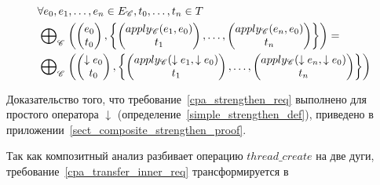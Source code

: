 \begin{itemize}
\begin{equation}
\label{cpa_strengthen_req}
\begin{aligned}
& \forall e_0, e_1, \dots, e_n \in E_{\mathscr{C}}, t_0, \dots, t_n \in T \\
& \mathrel{\bigoplus}_{\mathscr{C}}
\left(
\begin{pmatrix}
e_0 \\
t_0 
\end{pmatrix},
\left\{
\begin{pmatrix}
apply_{\mathscr{C}}(e_1, e_0) \\
t_1 
\end{pmatrix},
\dots ,
\begin{pmatrix}
apply_{\mathscr{C}}(e_n, e_0) \\
t_n 
\end{pmatrix}
\right\}
\right) = \\
& \mathrel{\bigoplus}_{\mathscr{C}}
\left(
\begin{pmatrix}
\downarrow e_0 \\
t_0 
\end{pmatrix},
\left\{
\begin{pmatrix}
apply_{\mathscr{C}}(\downarrow e_1, \downarrow e_0) \\
t_1 
\end{pmatrix},
\dots ,
\begin{pmatrix}
apply_{\mathscr{C}}(\downarrow e_n, \downarrow e_0) \\
t_n 
\end{pmatrix}
\right\}
\right)
\end{aligned}
\end{equation}

Доказательство того, что требование~\ref{cpa_strengthen_req} выполнено для простого оператора $\downarrow$ (определение~\ref{simple_strengthen_def}), приведено в приложении~\ref{sect_composite_strengthen_proof}.

Так как композитный анализ разбивает операцию $thread\_create$ на две дуги, требование~\ref{cpa_transfer_inner_req} трансформируется в


\end{itemize}
